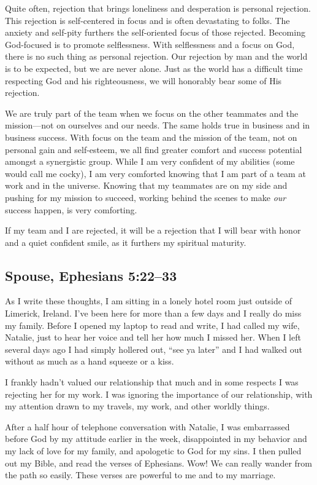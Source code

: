 \documentclass[12pt]{memoir}
\begin{document}
Quite often, rejection that brings loneliness and desperation is
personal rejection. This rejection is self-centered in focus and is often devastating to folks. The anxiety and self-pity furthers
the self-oriented focus of those rejected. Becoming God-focused is to promote selflessness. With selflessness and a focus on
God, there is no such thing as personal rejection. Our rejection by
man and the world is to be expected, but we are never alone. Just
as the world has a difficult time respecting God and his righteousness, we will honorably bear some of His rejection. 

We are truly part of the team when we focus on the other teammates and the mission---not on ourselves and our needs. The same holds true in business and in business success. With focus on the team and the mission of the team, not on personal gain and self-esteem, we all find greater comfort and success potential amongst a synergistic group. While I am very confident of my abilities (some would call me cocky), I am very comforted knowing that I am part of a team at work and in the universe. Knowing that my teammates are on my side and pushing for my mission to succeed, working behind the scenes to make \emph{our} success happen, is very comforting.

If my team and I are rejected, it will be a rejection that I will bear with honor and a quiet confident smile, as it furthers my spiritual maturity.

\subsection[Spouse]{Spouse, Ephesians 5:22--33}

As I write these thoughts, I am sitting in a lonely hotel room just outside of Limerick, Ireland. I've been here for more than a few days and I really do miss my family. Before I opened my laptop to read and write, I had called my wife, Natalie, just to hear her voice and tell her how much I missed her. When I left several days ago I had simply hollered out, ``see ya later'' and I had walked out without as much as a hand squeeze or a kiss.

I frankly hadn't valued our relationship that much and in some respects I was rejecting her for my work. I was ignoring the importance of our relationship, with my attention drawn to my travels, my work, and other worldly things. 

After a half hour of telephone conversation with Natalie, I was embarrassed
before God by my attitude earlier in the week, disappointed in my
behavior and my lack of love for my family, and apologetic to God
for my sins. I then pulled out my Bible, and read the verses of Ephesians.
Wow! We can really wander from the path so easily. These verses are
powerful to me and to my marriage. 
\end{document}
